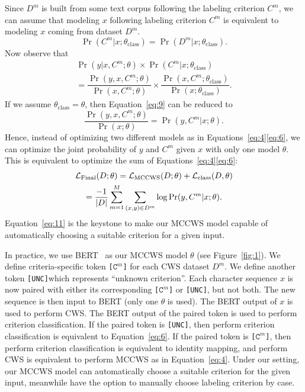 \documentclass[11pt]{article}
\newcommand{\loss}{\mathcal{L}}
\newcommand{\UNC}{\texttt{[UNC]}}
\newcommand{\Ck}[1]{\texttt{[\(\mathtt{C}^{#1}\)]}}
\newcommand{\opClass}{\operatorname{class}}
\newcommand{\opMCCWS}{\operatorname{MCCWS}}
\newcommand{\opFinal}{\operatorname{Final}}
\newcommand{\thetaC}{\theta_{\opClass}}
\DeclarePairedDelimiter{\abs}{\lvert}{\rvert}
\begin{document}
Since \(D^m\) is built from some text corpus following the labeling criterion \(C^m\), we can assume that modeling \(x\) following labeling criterion \(C^m\) is equivalent to modeling \(x\) coming from dataset \(D^m\).
\begin{equation}\label{eq:8}
  \Pr(C^m | x ; \thetaC) = \Pr(D^m | x ; \thetaC).
\end{equation}
Now observe that
\begin{multline}\label{eq:9}
  \Pr(y | x, C^m ; \theta) \times \Pr(C^m | x ; \thetaC)                                                                              \\
  = \dfrac{\Pr(y, x, C^m ; \theta)}{\Pr(x, C^m ; \theta)} \times \dfrac{\Pr(x, C^m ; \thetaC)}{\Pr(x ; \thetaC)}.
\end{multline}
If we assume \(\thetaC = \theta\), then Equation~\eqref{eq:9} can be reduced to
\begin{equation}\label{eq:10}
  \dfrac{\Pr(y, x, C^m ; \theta)}{\Pr(x ; \theta)} = \Pr(y, C^m | x ; \theta).
\end{equation}
Hence, instead of optimizing two different models as in Equations~\eqref{eq:4}\eqref{eq:6}, we can optimize the joint probability of \(y\) and \(C^m\) given \(x\) with only one model \(\theta\).
This is equivalent to optimize the sum of Equations~\eqref{eq:4}\eqref{eq:6}:
\begin{multline}\label{eq:11}
  \loss_{\opFinal}(D ; \theta) = \loss_{\opMCCWS}(D ; \theta) + \loss_{\opClass}(D, \theta) \\
  = \dfrac{-1}{\abs{D}} \sum_{m = 1}^M \sum_{(x, y) \in D^m} \log \Pr(y, C^m | x ; \theta).
\end{multline}
Equation~\eqref{eq:11} is the keystone to make our MCCWS model capable of automatically choosing a suitable criterion for a given input.

In practice, we use BERT~\cite{devlin-etal-2019-bert} as our MCCWS model \(\theta\) (see Figure~\ref{fig:1}).
We define criteria-specific token \Ck{m} for each CWS dataset \(D^m\).
We define another token \UNC which represents ``unknown criterion''.
Each character sequence \(x\) is now paired with either its corresponding \Ck{m} or \UNC, but not both.
The new sequence is then input to BERT (only one \(\theta\) is used).
The BERT output of \(x\) is used to perform CWS.
The BERT output of the paired token is used to perform criterion classification.
If the paired token is \UNC, then perform criterion classification is equivalent to Equation~\eqref{eq:6}.
If the paired token is \Ck{m}, then perform criterion classification is equivalent to identity mapping, and perform CWS is equivalent to perform MCCWS as in Equation~\eqref{eq:4}.
Under our setting, our MCCWS model can automatically choose a suitable criterion for the given input, meanwhile have the option to manually choose labeling criterion by case.
\end{document}
